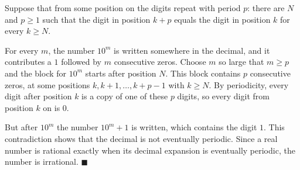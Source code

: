 Suppose that from some position on the digits repeat with period $p$: there are $N$ and $p\ge1$ such that the digit in position $k+p$ equals the digit in position $k$ for every $k\ge N$.

For every $m$, the number $10^m$ is written somewhere in the decimal, and it contributes a $1$ followed by $m$ consecutive zeros. Choose $m$ so large that $m\ge p$ and the block for $10^m$ starts after position $N$. This block contains $p$ consecutive zeros, at some positions $k,k+1,\dots,k+p-1$ with $k\ge N$. By periodicity, every digit after position $k$ is a copy of one of these $p$ digits, so every digit from position $k$ on is $0$.

But after $10^m$ the number $10^m+1$ is written, which contains the digit $1$. This contradiction shows that the decimal is not eventually periodic. Since a real number is rational exactly when its decimal expansion is eventually periodic, the number is irrational. $\blacksquare$
